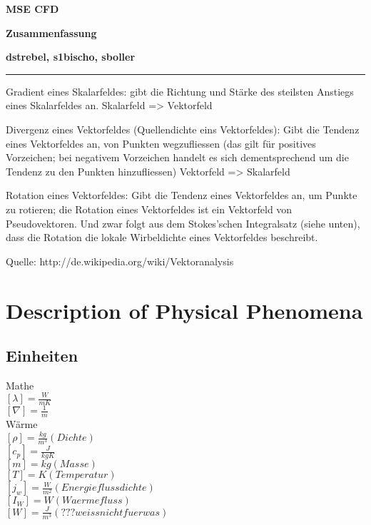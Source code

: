\documentclass[a4paper]{scrartcl}
\begin{document}
\pagestyle{fancy}
\fancyhf{}
\fancyfoot[C]{\thepage} %
\renewcommand{\headrulewidth}{0pt}
\renewcommand{\footrulewidth}{0.5pt}

 \centerline{\LARGE \bf \textsf{MSE CFD}} 
 \smallskip
\centerline{\Large \bf \textsf {Zusammenfassung}}
\medskip
  \centerline{\bf \textsf{dstrebel, s1bischo, sboller }}

 \smallskip \noindent\rule{\textwidth}{0.5pt}
\smallskip%




Gradient eines Skalarfeldes: gibt die Richtung und Stärke des steilsten Anstiegs
eines Skalarfeldes an.
Skalarfeld => Vektorfeld

Divergenz eines Vektorfeldes (Quellendichte eins Vektorfeldes): Gibt die Tendenz
eines Vektorfeldes an, von Punkten wegzufliessen (das gilt für positives
Vorzeichen; bei negativem Vorzeichen handelt es sich dementsprechend um die
Tendenz zu den Punkten hinzufliessen) Vektorfeld => Skalarfeld

Rotation eines Vektorfeldes: Gibt die Tendenz eines Vektorfeldes an, um Punkte
zu rotieren; die Rotation eines Vektorfeldes ist ein Vektorfeld von
Pseudovektoren. Und zwar folgt aus dem Stokes’schen Integralsatz (siehe unten),
dass die Rotation die lokale Wirbeldichte eines Vektorfeldes beschreibt.

Quelle: http://de.wikipedia.org/wiki/Vektoranalysis



\section{Description of Physical Phenomena}
\subsection{Einheiten}

Mathe\\
$ [\lambda]=\frac{W}{mK} $\\
$ [\nabla]=\frac{1}{m} $\\

Wärme\\
$ [\rho]=\frac{kg}{m^3} (Dichte)$\\
$ [c_p]=\frac{J}{kgK} $\\
$ [m]=kg (Masse)$\\
$ [T]=K (Temperatur)$\\
$ [j_w]=\frac{W}{m^2} (Energieflussdichte)$\\
$ [I_W]=W (Waermefluss)$\\
$ [W]=\frac{J}{m^3} (???weiss nicht fuer was)$\\
\end{document}
